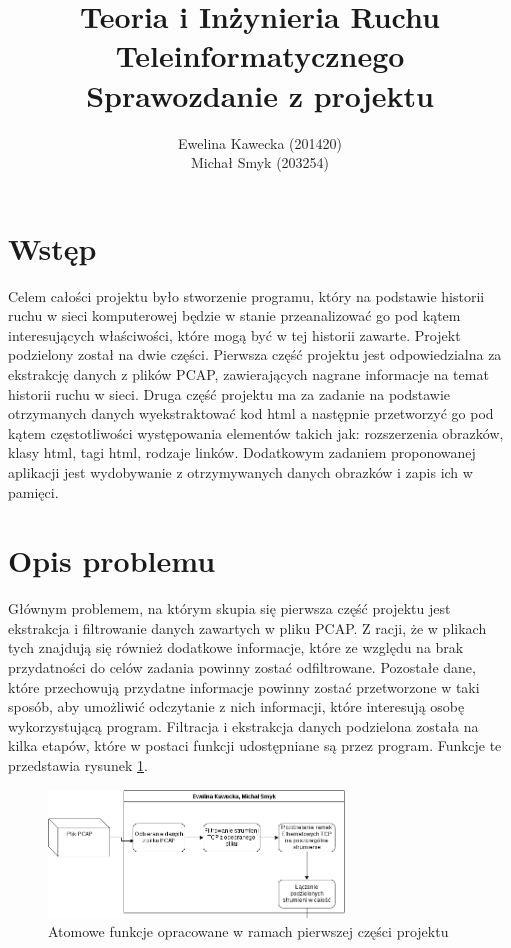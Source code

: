 \documentclass[12pt]{article}
\title{Teoria i Inżynieria Ruchu Teleinformatycznego \\ Sprawozdanie z projektu}
\author{Ewelina Kawecka (201420) \\ Michał Smyk (203254)}
\begin{document}
\maketitle
\thispagestyle{empty}
\clearpage
\setcounter{page}{1}

\section{Wstęp}
Celem całości projektu było stworzenie programu, który na podstawie historii ruchu w sieci komputerowej będzie w stanie przeanalizować go pod kątem interesujących właściwości, które mogą być w tej historii zawarte. Projekt podzielony został na dwie części. Pierwsza część projektu jest odpowiedzialna za ekstrakcję danych z plików PCAP, zawierających nagrane informacje na temat historii ruchu w sieci. Druga część projektu ma za zadanie na podstawie otrzymanych danych wyekstraktować kod html a następnie przetworzyć go pod kątem częstotliwości występowania elementów takich jak: rozszerzenia obrazków, klasy html, tagi html, rodzaje linków. Dodatkowym zadaniem proponowanej aplikacji jest wydobywanie z otrzymywanych danych obrazków i zapis ich w pamięci. 

\section{Opis problemu}
Głównym problemem, na którym skupia się pierwsza część projektu jest ekstrakcja i filtrowanie danych zawartych w pliku PCAP. Z racji, że w plikach tych znajdują się również dodatkowe informacje, które ze względu na brak przydatności do celów zadania powinny zostać odfiltrowane. Pozostałe dane, które przechowują przydatne informacje powinny zostać przetworzone w taki sposób, aby umożliwić odczytanie z nich informacji, które interesują osobę wykorzystującą program. Filtracja i ekstrakcja danych podzielona została na kilka etapów, które w postaci funkcji udostępniane są przez program. Funkcje te przedstawia rysunek \ref{img:funkcje}.

\begin{figure}[h]
\centering
\caption{Atomowe funkcje opracowane w ramach pierwszej części projektu}
\label{img:funkcje}
\includegraphics[width=0.7\textwidth]{Wykres.png}
\end{figure}
\end{document}
